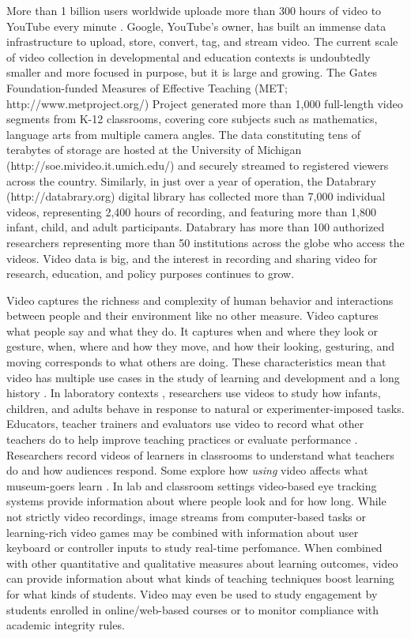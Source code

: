\documentclass[letterpaper,man,apacite]{apa6}
\begin{document}
More than 1 billion users worldwide uploade more than 300 hours of video to YouTube every minute \cite{YouTube2015}. 
Google, YouTube's owner, has built an immense data infrastructure to upload, store, convert, tag, and stream video. 
The current scale of video collection in developmental and education contexts is undoubtedly smaller and more focused in purpose, but it is large and growing. 
The Gates Foundation-funded Measures of Effective Teaching (MET; http://www.metproject.org/) Project generated more than 1,000 full-length video segments from K-12 classrooms, covering core subjects such as mathematics, language arts from multiple camera angles. 
The data constituting tens of terabytes of storage are hosted at the University of Michigan (http://soe.mivideo.it.umich.edu/) and securely streamed to registered viewers across the country.
Similarly, in just over a year of operation, the Databrary (http://databrary.org) digital library has collected more than 7,000 individual videos, representing 2,400 hours of recording, and featuring more than 1,800 infant, child, and adult participants.
Databrary has more than 100 authorized researchers representing more than 50 institutions across the globe who access the videos.
Video data is big, and the interest in recording and sharing video for research, education, and policy purposes continues to grow.

Video captures the richness and complexity of human behavior and interactions between people and their environment like no other measure.
Video captures what people say and what they do.
It captures when and where they look or gesture, when, where and how they move, and how their looking, gesturing, and moving corresponds to what others are doing.
These characteristics mean that video has multiple use cases in the study of learning and development and a long history \cite{Goldman2007,Scott2011}.
In laboratory contexts \cite{Karasik2014}, researchers use videos to study how infants, children, and adults behave in response to natural or experimenter-imposed tasks.
Educators, teacher trainers and evaluators use video to record what other teachers do to help improve teaching practices or evaluate performance \cite{Blomberg2014, Masats20111151, Baecher2013189}.
Researchers record videos of learners in classrooms \cite{Alibali2012} to understand what teachers do and how audiences respond.
Some explore how \emph{using} video affects what museum-goers learn \cite{Bakken2015}.
In lab \cite{Kretch2014} and classroom \cite{Mason2015, Prieto:2014:STC:2669485.2669543} settings video-based eye tracking systems provide information about where people look and for how long.
While not strictly video recordings, image streams from computer-based tasks or learning-rich video games may be combined with information about user keyboard or controller inputs to study real-time perfomance.
When combined with other quantitative and qualitative measures about learning outcomes, video can provide information about what kinds of teaching techniques boost learning for what kinds of students.
Video may even be used to study engagement by students enrolled in online/web-based courses or to monitor compliance with academic integrity rules.
\end{document}
